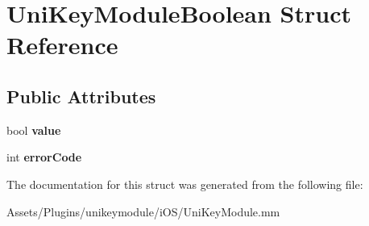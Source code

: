 \hypertarget{struct_uni_key_module_boolean}{}\section{Uni\+Key\+Module\+Boolean Struct Reference}
\label{struct_uni_key_module_boolean}
\subsection*{Public Attributes}
\begin{DoxyCompactItemize}
\item 
\mbox{\label{struct_uni_key_module_boolean_a7afee4ddf3bebf409c905d637261137c}} 
bool {\bfseries value}
\item 
\mbox{\label{struct_uni_key_module_boolean_acd72a7cfe27cfa86b28471e78cec74d9}} 
int {\bfseries error\+Code}
\end{DoxyCompactItemize}


The documentation for this struct was generated from the following file\+:\begin{DoxyCompactItemize}
\item 
Assets/\+Plugins/unikeymodule/i\+O\+S/Uni\+Key\+Module.\+mm\end{DoxyCompactItemize}
